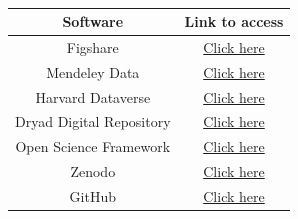 \begin{table}[ht]
    \centering 
    \caption{{\color{red}{List of repositories for share files in the public domain}}}
    \label{tab:list3}
    \begin{tabular}{|c|c|}
    \hline
         \textbf{Software} &  \textbf{Link to access} \\
    \hline
        Figshare &  \href{https://figshare.com/}{Click here} \\
        Mendeley Data &  \href{https://data.mendeley.com/}{Click here}  \\
        Harvard Dataverse &  \href{https://dataverse.harvard.edu/}{Click here}  \\
        Dryad Digital Repository & \href{https://datadryad.org/stash}{Click here} \\
        Open Science Framework &  \href{https://osf.io/}{Click here}  \\
        Zenodo & \href{https://zenodo.org/}{Click here} \\
        GitHub & \href{https://github.com/}{Click here} \\
    \hline
    \end{tabular}
\end{table}


